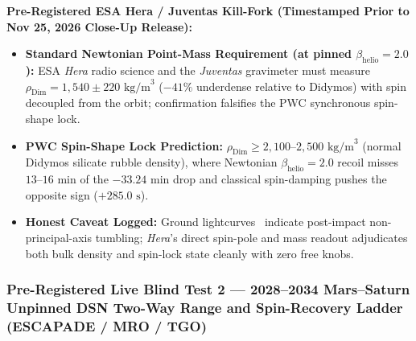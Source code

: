 \documentclass[11pt,a4paper]{article}
\begin{document}
\noindent\textbf{Pre-Registered ESA Hera / Juventas Kill-Fork (Timestamped Prior to Nov 25, 2026 Close-Up Release):}
\begin{itemize}
    \item \textbf{Standard Newtonian Point-Mass Requirement (at pinned $\beta_{\text{helio}} = 2.0$):} ESA \textit{Hera} radio science and the \textit{Juventas} gravimeter must measure $\rho_{\text{Dim}} = 1{,}540 \pm 220\text{ kg/m}^3$ ($-41\%$ underdense relative to Didymos) with spin decoupled from the orbit; confirmation falsifies the PWC synchronous spin-shape lock.
    \item \textbf{PWC Spin-Shape Lock Prediction:} $\rho_{\text{Dim}} \ge 2{,}100\text{--}2{,}500\text{ kg/m}^3$ (normal Didymos silicate rubble density), where Newtonian $\beta_{\text{helio}} = 2.0$ recoil misses $13\text{--}16\text{ min}$ of the $-33.24\text{ min}$ drop and classical spin-damping pushes the opposite sign ($+285.0\text{ s}$).
    \item \textbf{Honest Caveat Logged:} Ground lightcurves~\cite{Pravec2024} indicate post-impact non-principal-axis tumbling; \textit{Hera}'s direct spin-pole and mass readout adjudicates both bulk density and spin-lock state cleanly with zero free knobs.
\end{itemize}

\subsubsection{Pre-Registered Live Blind Test 2 --- 2028--2034 Mars--Saturn Unpinned DSN Two-Way Range and Spin-Recovery Ladder (ESCAPADE / MRO / TGO)}
\label{subsubsec:mars_saturn_prereg}
\end{document}
